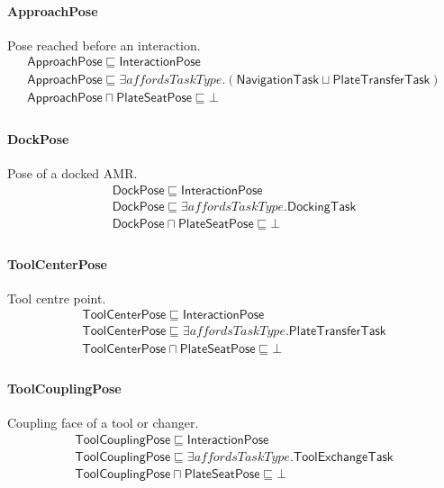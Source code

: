 \documentclass[10pt]{article}
\begin{document}
\paragraph{ApproachPose} Pose reached before an interaction.
\[\begin{array}{l}
\mathsf{ApproachPose} \sqsubseteq  \mathsf{InteractionPose} \\
\mathsf{ApproachPose} \sqsubseteq  \exists \mathit{affordsTaskType}.(\mathsf{NavigationTask} \sqcup  \mathsf{PlateTransferTask}) \\
\mathsf{ApproachPose} \sqcap  \mathsf{PlateSeatPose} \sqsubseteq  \bot  \\
\end{array}\]
\paragraph{DockPose} Pose of a docked AMR.
\[\begin{array}{l}
\mathsf{DockPose} \sqsubseteq  \mathsf{InteractionPose} \\
\mathsf{DockPose} \sqsubseteq  \exists \mathit{affordsTaskType}.\mathsf{DockingTask} \\
\mathsf{DockPose} \sqcap  \mathsf{PlateSeatPose} \sqsubseteq  \bot  \\
\end{array}\]
\paragraph{ToolCenterPose} Tool centre point.
\[\begin{array}{l}
\mathsf{ToolCenterPose} \sqsubseteq  \mathsf{InteractionPose} \\
\mathsf{ToolCenterPose} \sqsubseteq  \exists \mathit{affordsTaskType}.\mathsf{PlateTransferTask} \\
\mathsf{ToolCenterPose} \sqcap  \mathsf{PlateSeatPose} \sqsubseteq  \bot  \\
\end{array}\]
\paragraph{ToolCouplingPose} Coupling face of a tool or changer.
\[\begin{array}{l}
\mathsf{ToolCouplingPose} \sqsubseteq  \mathsf{InteractionPose} \\
\mathsf{ToolCouplingPose} \sqsubseteq  \exists \mathit{affordsTaskType}.\mathsf{ToolExchangeTask} \\
\mathsf{ToolCouplingPose} \sqcap  \mathsf{PlateSeatPose} \sqsubseteq  \bot  \\
\end{array}\]
\end{document}
